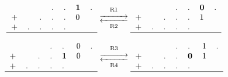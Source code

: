 \begin{figure}[hbt]
{\begin{minipage}{0.4\textwidth}



\end{minipage}
\qquad
\begin{minipage}{0.6\textwidth}
\[
\begin{tabular}{lllllll}
&&&.&.&\textbf 1&. \\
+&&.&.&.&0&\\
+&.&.&.&.&&\\
\hline
\end{tabular}
\mathrel{\mathop{\longrightleftarrows}^{\mathrm{R1}}_{\mathrm{R2}}}
\begin{tabular}{lllllll}
&&&.&.&\textbf 0&. \\
+&&.&.&.&1&\\
+&.&.&.&.&&\\
\hline
\end{tabular}
\]

\[
\begin{tabular}{lllllll}
&&&.&.&0&. \\
+&&.&.&\textbf 1&0&\\
+&.&.&.&.&&\\
\hline
\end{tabular}
\mathrel{\mathop{\longrightleftarrows}^{\mathrm{R3}}_{\mathrm{R4}}}
\begin{tabular}{lllllll}
&&&.&.&1&. \\
+&&.&.&\textbf 0&1&\\
+&.&.&.&.&&\\
\hline
\end{tabular}
\]


\end{minipage}}
\end{figure}
